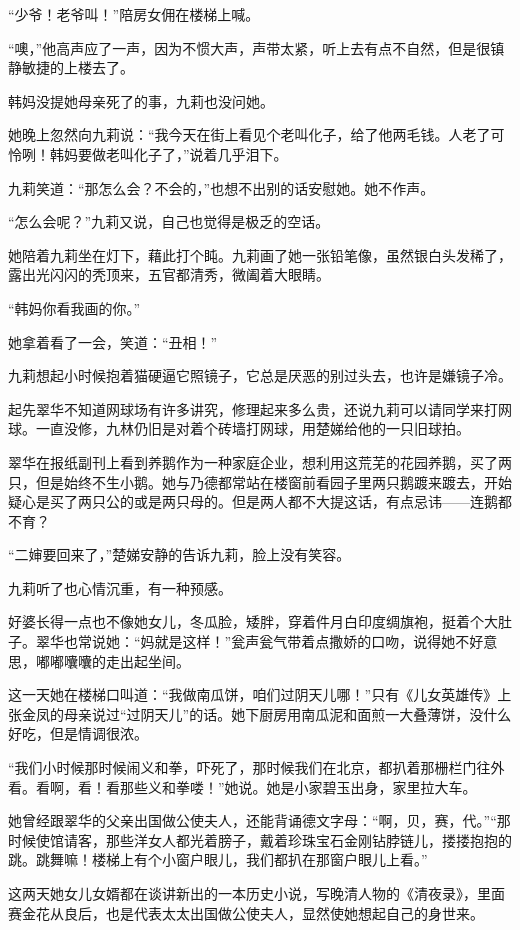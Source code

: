\par “少爷！老爷叫！”陪房女佣在楼梯上喊。
\par “噢，”他高声应了一声，因为不惯大声，声带太紧，听上去有点不自然，但是很镇静敏捷的上楼去了。
\par 韩妈没提她母亲死了的事，九莉也没问她。
\par 她晚上忽然向九莉说：“我今天在街上看见个老叫化子，给了他两毛钱。人老了可怜咧！韩妈要做老叫化子了，”说着几乎泪下。
\par 九莉笑道：“那怎么会？不会的，”也想不出别的话安慰她。她不作声。
\par “怎么会呢？”九莉又说，自己也觉得是极乏的空话。
\par 她陪着九莉坐在灯下，藉此打个盹。九莉画了她一张铅笔像，虽然银白头发稀了，露出光闪闪的秃顶来，五官都清秀，微阖着大眼睛。
\par “韩妈你看我画的你。”
\par 她拿着看了一会，笑道：“丑相！”
\par 九莉想起小时候抱着猫硬逼它照镜子，它总是厌恶的别过头去，也许是嫌镜子冷。
\par 起先翠华不知道网球场有许多讲究，修理起来多么贵，还说九莉可以请同学来打网球。一直没修，九林仍旧是对着个砖墙打网球，用楚娣给他的一只旧球拍。
\par 翠华在报纸副刊上看到养鹅作为一种家庭企业，想利用这荒芜的花园养鹅，买了两只，但是始终不生小鹅。她与乃德都常站在楼窗前看园子里两只鹅踱来踱去，开始疑心是买了两只公的或是两只母的。但是两人都不大提这话，有点忌讳——连鹅都不育？
\par “二婶要回来了，”楚娣安静的告诉九莉，脸上没有笑容。
\par 九莉听了也心情沉重，有一种预感。
\par 好婆长得一点也不像她女儿，冬瓜脸，矮胖，穿着件月白印度绸旗袍，挺着个大肚子。翠华也常说她：“妈就是这样！”瓮声瓮气带着点撒娇的口吻，说得她不好意思，嘟嘟囔囔的走出起坐间。
\par 这一天她在楼梯口叫道：“我做南瓜饼，咱们过阴天儿哪！”只有《儿女英雄传》上张金凤的母亲说过“过阴天儿”的话。她下厨房用南瓜泥和面煎一大叠薄饼，没什么好吃，但是情调很浓。
\par “我们小时候那时候闹义和拳，吓死了，那时候我们在北京，都扒着那栅栏门往外看。看啊，看！看那些义和拳喽！”她说。她是小家碧玉出身，家里拉大车。
\par 她曾经跟翠华的父亲出国做公使夫人，还能背诵德文字母：“啊，贝，赛，代。”“那时候使馆请客，那些洋女人都光着膀子，戴着珍珠宝石金刚钻脖链儿，搂搂抱抱的跳。跳舞嘛！楼梯上有个小窗户眼儿，我们都扒在那窗户眼儿上看。”
\par 这两天她女儿女婿都在谈讲新出的一本历史小说，写晚清人物的《清夜录》，里面赛金花从良后，也是代表太太出国做公使夫人，显然使她想起自己的身世来。
